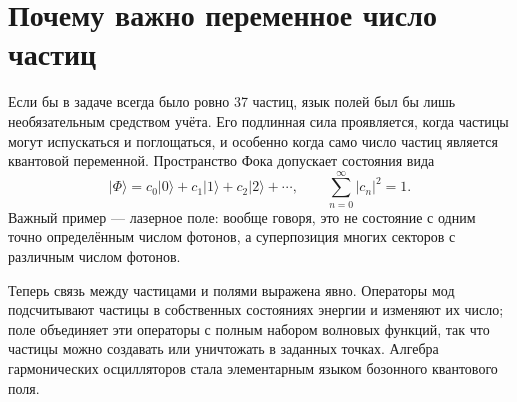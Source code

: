 \begin{classroomqa}
\end{classroomqa}

\begin{classroomqa}
\end{classroomqa}

\section{Почему важно переменное число частиц}

Если бы в задаче всегда было ровно 37 частиц, язык полей был бы лишь необязательным средством учёта. Его подлинная сила проявляется, когда частицы могут испускаться и поглощаться, и особенно когда само число частиц является квантовой переменной. Пространство Фока допускает состояния вида
\begin{equation}
|\Phi\rangle
=c_0|0\rangle+c_1|1\rangle+c_2|2\rangle+\cdots,
\qquad
\sum_{n=0}^{\infty}|c_n|^2=1.
\end{equation}
Важный пример — лазерное поле: вообще говоря, это не состояние с одним точно определённым числом фотонов, а суперпозиция многих секторов с различным числом фотонов.

Теперь связь между частицами и полями выражена явно. Операторы мод подсчитывают частицы в собственных состояниях энергии и изменяют их число; поле объединяет эти операторы с полным набором волновых функций, так что частицы можно создавать или уничтожать в заданных точках. Алгебра гармонических осцилляторов стала элементарным языком бозонного квантового поля.
